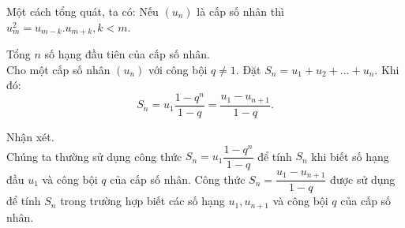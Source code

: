 \begin{note}
Một cách tổng quát, ta có: 
Nếu $(u_n)$ là cấp số nhân thì $u_m^2=u_{m-k}. u_{m+k}, k<m$.
\end{note}
\begin{dl}
	Tổng $n$ số hạng đầu tiên của cấp số nhân.\\
	Cho một cấp số nhân $(u_n)$ với công bội $q\ne 1$.  Đặt $S_n=u_1+u_2+... +u_n$. Khi đó: 
	$$S_n=u_1 \dfrac{1-q^n}{1-q}=\dfrac{u_1-u_{n+1}}{1-q}.$$
\end{dl}
\begin{note}
	Nhận xét.\\
	Chúng ta thường sử dụng công thức $S_n=u_1 \dfrac{1-q^n}{1-q}$ để tính $S_n$ khi biết số hạng đầu $u_1$ và công bội $q$ của cấp số nhân. Công thức $S_n=\dfrac{u_1-u_{n+1}}{1-q}$ được sử dụng để tính $S_n$ trong trường hợp biết các số hạng $u_1, u_{n+1}$ và  công bội $q$ của cấp số nhân.
	
\end{note}
